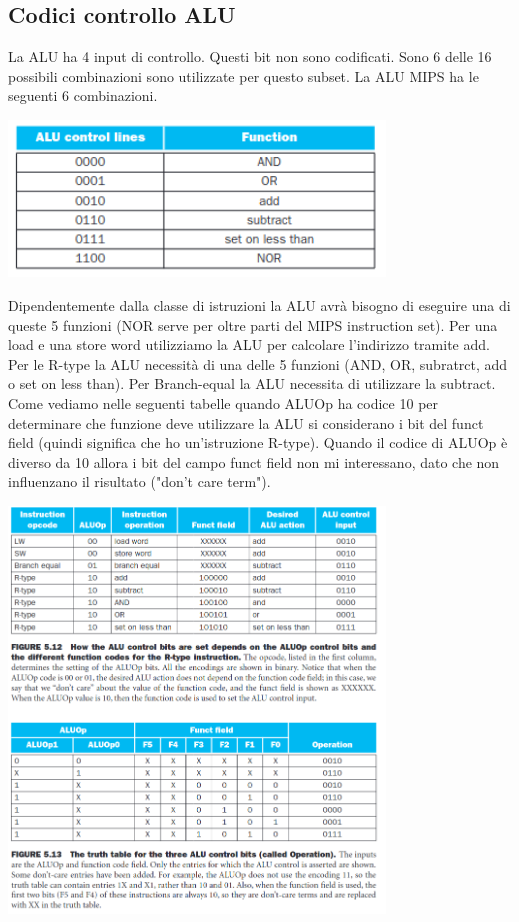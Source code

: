 \documentclass[12pt, a4paper, openany]{book}
\begin{document}
\subsection*{Codici controllo ALU}
La ALU ha 4 input di controllo. Questi bit non sono codificati.
Sono 6 delle 16 possibili combinazioni sono utilizzate per questo subset. La ALU 
MIPS ha le seguenti 6 combinazioni.
\begin{center}
    \includegraphics[width=100mm, scale=0.5]{ALU Control.png}
\end{center}
Dipendentemente dalla classe di istruzioni la ALU avrà bisogno di eseguire
una di queste 5 funzioni (NOR serve per oltre parti del MIPS instruction set).
Per una load e una store word utilizziamo la ALU per calcolare l'indirizzo tramite add.
Per le R-type la ALU necessità di una delle 5 funzioni (AND, OR, subratrct, add o set on less than).
Per Branch-equal la ALU necessita di utilizzare la subtract.
\\ Come vediamo nelle seguenti tabelle quando ALUOp ha codice 10 per determinare che funzione
deve utilizzare la ALU si considerano i bit del funct field (quindi significa che ho un'istruzione
R-type).
Quando il codice di ALUOp è diverso da 10 allora i bit del campo funct field non mi interessano, dato che
non influenzano il risultato ("don't care term").
\begin{center}
    \includegraphics[width=100mm, scale=0.5]{ALUOPcode.png}
\end{center}
\end{document}
